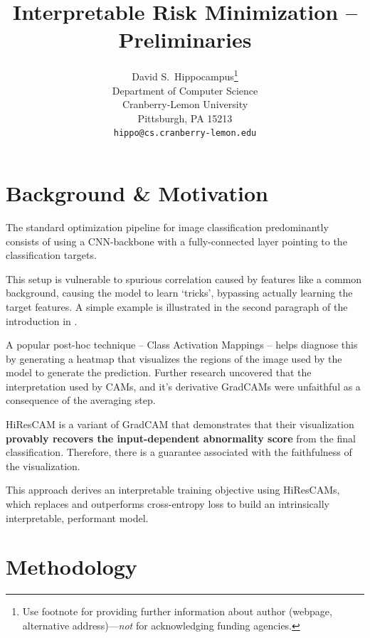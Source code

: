 \documentclass{article}
\title{Interpretable Risk Minimization -- Preliminaries}
\author{%
  David S.~Hippocampus\thanks{Use footnote for providing further information
    about author (webpage, alternative address)---\emph{not} for acknowledging
    funding agencies.} \\
  Department of Computer Science\\
  Cranberry-Lemon University\\
  Pittsburgh, PA 15213 \\
  \texttt{hippo@cs.cranberry-lemon.edu} \\
}
\begin{document}
\maketitle




\section{Background \& Motivation}

The standard optimization pipeline for image classification predominantly consists of using a CNN-backbone with a fully-connected layer pointing to the classification targets.

This setup is vulnerable to spurious correlation caused by features like a common background, causing the model to learn `tricks', bypassing actually learning the target features. A simple example is illustrated in the second paragraph of the introduction in \cite{arjovsky2020invariantriskminimization}.

A popular post-hoc technique -- Class Activation Mappings \citep{zhou2016learning} -- helps diagnose this by generating a heatmap that visualizes the regions of the image used by the model to generate the prediction. Further research uncovered that the interpretation used by CAMs, and it's derivative GradCAMs were unfaithful as a consequence of the averaging step.

HiResCAM \citep{draelos2020use} is a variant of GradCAM \citep{selvaraju2017grad} that demonstrates that their visualization \textbf{provably recovers the input-dependent abnormality score} from the final classification. Therefore, there is a guarantee associated with the faithfulness of the visualization.

This approach derives an interpretable training objective using HiResCAMs, which replaces and outperforms cross-entropy loss to build an intrinsically interpretable, performant model.

\section{Methodology}
\end{document}
